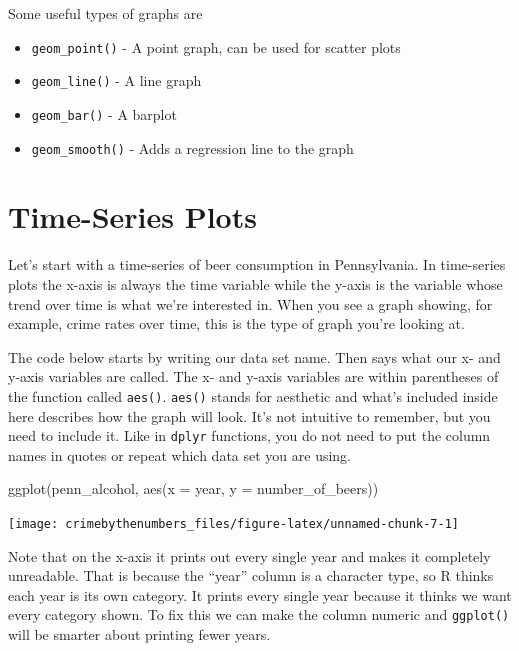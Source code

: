 \documentclass[
]{krantz}
\makeatletter
\newenvironment{Shaded}{\begin{snugshade}}{\end{snugshade}}
\newcommand{\AttributeTok}[1]{\textcolor[rgb]{0.61,0.61,0.61}{#1}}
\newcommand{\FunctionTok}[1]{\textcolor[rgb]{0,0,0}{#1}}
\newcommand{\NormalTok}[1]{#1}
\providecommand{\tightlist}{%
  \setlength{\itemsep}{0pt}\setlength{\parskip}{0pt}}
\newenvironment{kframe}{%
\medskip{}
\setlength{\fboxsep}{.8em}
 \def\at@end@of@kframe{}%
 \ifinner\ifhmode%
  \def\at@end@of@kframe{\end{minipage}}%
  \begin{minipage}{\columnwidth}%
 \fi\fi%
 \def\FrameCommand##1{\hskip\@totalleftmargin \hskip-\fboxsep
 \colorbox{shadecolor}{##1}\hskip-\fboxsep
     \hskip-\linewidth \hskip-\@totalleftmargin \hskip\columnwidth}%
 \MakeFramed {\advance\hsize-\width
   \@totalleftmargin\z@ \linewidth\hsize
   \@setminipage}}%
 {\par\unskip\endMakeFramed%
 \at@end@of@kframe}
\renewenvironment{Shaded}{\begin{kframe}}{\end{kframe}}
\makeatother
\begin{document}
Some useful types of graphs are

\begin{itemize}
\tightlist
\item
  \texttt{geom\_point()} - A point graph, can be used for scatter plots
\item
  \texttt{geom\_line()} - A line graph
\item
  \texttt{geom\_bar()} - A barplot
\item
  \texttt{geom\_smooth()} - Adds a regression line to the graph
\end{itemize}

\hypertarget{time-series-plots}{%
\section{Time-Series Plots}\label{time-series-plots}}

Let's start with a time-series of beer consumption in Pennsylvania. In time-series plots the x-axis is always the time variable while the y-axis is the variable whose trend over time is what we're interested in. When you see a graph showing, for example, crime rates over time, this is the type of graph you're looking at.

The code below starts by writing our data set name. Then says what our x- and y-axis variables are called. The x- and y-axis variables are within parentheses of the function called \texttt{aes()}. \texttt{aes()} stands for aesthetic and what's included inside here describes how the graph will look. It's not intuitive to remember, but you need to include it. Like in \texttt{dplyr} functions, you do not need to put the column names in quotes or repeat which data set you are using.

\begin{Shaded}
\begin{Highlighting}[]
\FunctionTok{ggplot}\NormalTok{(penn\_alcohol, }\FunctionTok{aes}\NormalTok{(}\AttributeTok{x =}\NormalTok{ year,}
                         \AttributeTok{y =}\NormalTok{ number\_of\_beers))}
\end{Highlighting}
\end{Shaded}

\begin{center}\texttt{[image: crimebythenumbers\_files/figure-latex/unnamed-chunk-7-1]} \end{center}

Note that on the x-axis it prints out every single year and makes it completely unreadable. That is because the ``year'' column is a character type, so R thinks each year is its own category. It prints every single year because it thinks we want every category shown. To fix this we can make the column numeric and \texttt{ggplot()} will be smarter about printing fewer years.
\end{document}
